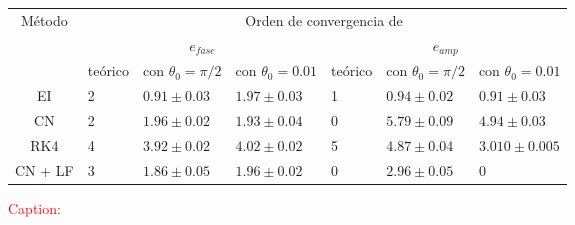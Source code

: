 \documentclass[aps,prb,twocolumn,superscriptaddress,floatfix,longbibliography]{revtex4-2}
\newcounter{para}
\begin{document}
\onecolumngrid

\begin{table}[]
  \begin{tabular}{|c|llllll|}
  \hline
  \multirow{3}{*}{Método} &
    \multicolumn{6}{c|}{Orden de convergencia de} \\ \cline{2-7} 
   &
    \multicolumn{3}{c|}{$e_{fase}$} &
    \multicolumn{3}{c|}{$e_{amp}$} \\ \cline{2-7} 
   &
    \multicolumn{1}{c|}{teórico} &
    \multicolumn{1}{c|}{con $\theta_0 = \pi/2$} &
    \multicolumn{1}{c|}{con $\theta_0 = 0.01$} &
    \multicolumn{1}{c|}{teórico} &
    \multicolumn{1}{c|}{con $\theta_0 = \pi/2$} &
    \multicolumn{1}{c|}{con $\theta_0 = 0.01$} \\ \hline
  EI &
    \multicolumn{1}{l|}{2} &
    \multicolumn{1}{l|}{$0.91 \pm 0.03$} &
    \multicolumn{1}{l|}{$1.97 \pm 0.03$} &
    \multicolumn{1}{l|}{1} &
    \multicolumn{1}{l|}{$0.94 \pm 0.02$} &
    $0.91 \pm 0.03$ \\ \hline
  CN &
    \multicolumn{1}{l|}{2} &
    \multicolumn{1}{l|}{$1.96 \pm 0.02$} &
    \multicolumn{1}{l|}{$1.93 \pm 0.04$} &
    \multicolumn{1}{l|}{0} &
    \multicolumn{1}{l|}{$5.79 \pm 0.09$} &
    $4.94 \pm 0.03$ \\ \hline
  RK4 &
    \multicolumn{1}{l|}{4} &
    \multicolumn{1}{l|}{$3.92 \pm 0.02$} &
    \multicolumn{1}{l|}{$4.02 \pm 0.02$} &
    \multicolumn{1}{l|}{5} &
    \multicolumn{1}{l|}{$4.87 \pm 0.04$} &
    $3.010 \pm 0.005$ \\ \hline
  CN + LF &
    \multicolumn{1}{l|}{3} &
    \multicolumn{1}{l|}{$1.86 \pm 0.05$} &
    \multicolumn{1}{l|}{$1.96 \pm 0.02$} &
    \multicolumn{1}{l|}{0} &
    \multicolumn{1}{l|}{$2.96 \pm 0.05$} &
    0 \\ \hline
  \end{tabular}
  \end{table}

\textcolor{red}{Caption: }

\end{document}
